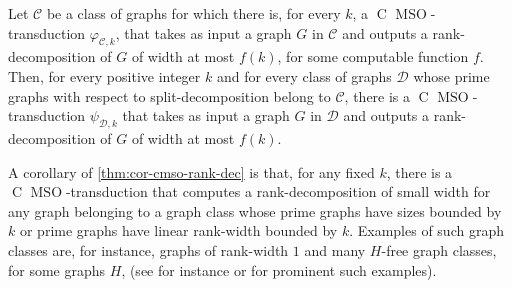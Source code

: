 \documentclass{lmcs} %
\newcommand{\MSO}{\ensuremath{\operatorname{MSO}}\xspace}
\newcommand{\CMSO}[1][]{\ensuremath{\C[#1]{\!\!}\MSO}\xspace}
\newcommand{\C}[1][]{\ensuremath{\operatorname{C}_{#1}}\xspace}
\begin{document}
\begin{thm}\label{thm:cor-cmso-rank-dec} Let $\mathcal{C}$ be a class of graphs for which there is, for every $k$, a \CMSO-transduction $\varphi_{\mathcal{C},k}$, that takes as input a
  graph $G$ in $\mathcal{C}$ and outputs a rank-decomposition of $G$ of width at most $f(k)$, for some computable function $f$. Then, for every positive integer
  $k$ and for every class of graphs
  $\mathcal{D}$ whose prime graphs with respect to split-decomposition belong to $\mathcal{C}$, there is a \CMSO-transduction
  $\psi_{\mathcal{D},k}$ that takes as input a graph $G$ in $\mathcal{D}$ and outputs a rank-decomposition of $G$ of width at most $f(k)$. 
\end{thm}

 A corollary of \autoref{thm:cor-cmso-rank-dec} is that, for any fixed
$k$, there is a \CMSO-transduction that computes a rank-decomposition of small width for any graph belonging to a graph class whose prime graphs have sizes
bounded by $k$ or prime graphs have linear rank-width bounded by $k$. Examples of such graph classes are, for instance,
graphs of rank-width $1$ and many $H$-free graph classes, for some graphs $H$, (see
for instance \cite{BrandstadtDLM05} or \cite{Rao07} for prominent such examples). 





\appendix
\end{document}
